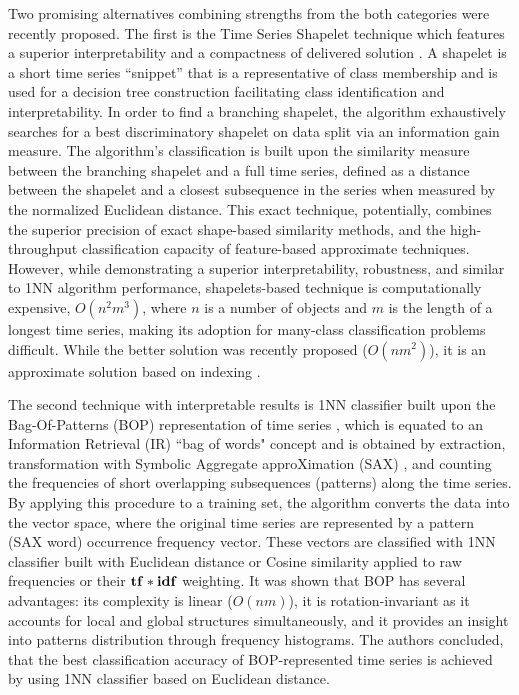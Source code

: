 Two promising alternatives combining strengths from the both categories were recently proposed.
The first is the Time Series Shapelet technique which features a superior interpretability and a compactness of delivered solution 
\cite{citeulike:7344347}. A shapelet is a short time series ``snippet'' that is a representative of class
membership and is used for a decision tree construction facilitating class identification and interpretability.
In order to find a branching shapelet, the algorithm exhaustively searches for a best discriminatory shapelet on data split 
via an information gain measure. The algorithm's classification is built upon the similarity measure between the branching 
shapelet and a full time series, defined as a distance between the shapelet and a closest subsequence in the series 
when measured by the normalized Euclidean distance. This exact technique, potentially, combines the superior precision of 
exact shape-based similarity methods, and the high-throughput classification capacity of feature-based approximate techniques. 
However, while demonstrating a superior interpretability, robustness, and similar to 1NN algorithm performance, shapelets-based 
technique is computationally expensive, $O(n^{2}m^{3})$, where $n$ is a number of objects and $m$ is the length of a longest 
time series, making its adoption for many-class classification problems difficult\cite{citeulike:11345338}. 
While the better solution was recently proposed ($O(nm^{2})$), it is an approximate solution based on indexing \cite{citeulike:12563493}.

The second technique with interpretable results is 1NN classifier built upon the Bag-Of-Patterns (BOP) representation of time series 
\cite{citeulike:10525778}, which is equated to an Information Retrieval (IR) ``bag of words" concept 
and is obtained by extraction, transformation with Symbolic Aggregate approXimation (SAX) \cite{sax}, and counting the frequencies
of short overlapping subsequences (patterns) along the time series.
By applying this procedure to a training set, the algorithm converts the data into the vector space, where the original time series are 
represented by a pattern (SAX word) occurrence frequency vector. These vectors are classified with 1NN classifier built with Euclidean 
distance or Cosine similarity applied to raw frequencies or their $\text{\textbf{tf}}\ast\text{\textbf{idf}}$ weighting. 
It was shown that BOP has several advantages: its complexity is linear ($O(nm)$), it is rotation-invariant as it accounts for local and 
global structures simultaneously, and it provides an insight into patterns distribution through frequency histograms.
The authors concluded, that the best classification accuracy of BOP-represented time series is achieved by using 1NN classifier based 
on Euclidean distance. 

